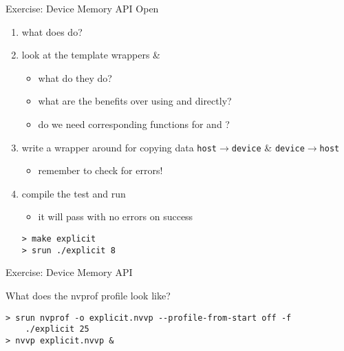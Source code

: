 \documentclass[aspectratio=43]{beamer}
\begin{document}
\begin{frame}[fragile]{Exercise: Device Memory API}
    Open 
    \begin{enumerate}
        \item what does  do?
        \item look at the template wrappers  \& 
        \begin{itemize}
            \item what do they do?
            \item what are the benefits over using  and  directly?
            \item do we need corresponding functions for  and ?
        \end{itemize}

        \item write a wrapper around  for copying data \texttt{host$\rightarrow$device} \& \texttt{device$\rightarrow$host}
        \begin{itemize}
            \item remember to check for errors!
        \end{itemize}

        \item compile the test and run
        \begin{itemize}
            \item it will pass with no errors on success
        \end{itemize}

    \vspace{-5pt}
\begin{terminal}{}
\begin{lstlisting}[style=terminal]
> make explicit
> srun ./explicit 8
\end{lstlisting}
\end{terminal}
    \end{enumerate}

\end{frame}

\begin{frame}[fragile]{Exercise: Device Memory API}

What does the nvprof profile look like?

\begin{terminal}{}
\begin{lstlisting}[style=terminal]
> srun nvprof -o explicit.nvvp --profile-from-start off -f
    ./explicit 25
> nvvp explicit.nvvp &
\end{lstlisting}
\end{terminal}

\end{frame}
\end{document}
